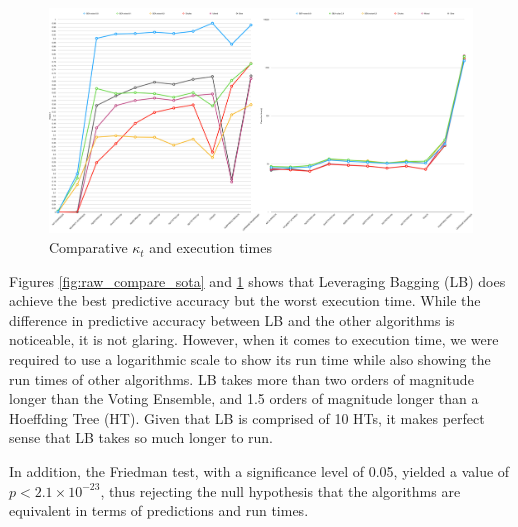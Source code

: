 \documentclass[runningheads]{llncs}
\begin{document}

\begin{figure}
  \includegraphics[width=\linewidth]{./images/chapter5/compare_sota_all}
\caption{\label{fig:raw_compare_sota_all} Comparative $\kappa_t$ and execution times}
\end{figure}

 Figures \ref{fig:raw_compare_sota} and \ref{fig:raw_compare_sota_all} shows that Leveraging Bagging (LB) does achieve the best predictive accuracy but the worst execution time. While the difference in predictive accuracy between LB and the other algorithms is noticeable, it is not glaring. However, when it comes to execution time, we were required to use a logarithmic scale to show its run time while also showing the run times of other algorithms. LB takes more than two orders of magnitude longer than the Voting Ensemble, and 1.5 orders of magnitude longer than a Hoeffding Tree (HT). Given that LB is comprised of 10 HTs, it makes perfect sense that LB takes so much longer to run.

In addition, the Friedman test, with a significance level of 0.05, yielded a value of $p < 2.1\times10^{-23}$, thus rejecting the null hypothesis that the algorithms are equivalent in terms of predictions and run times.


\end{document}

